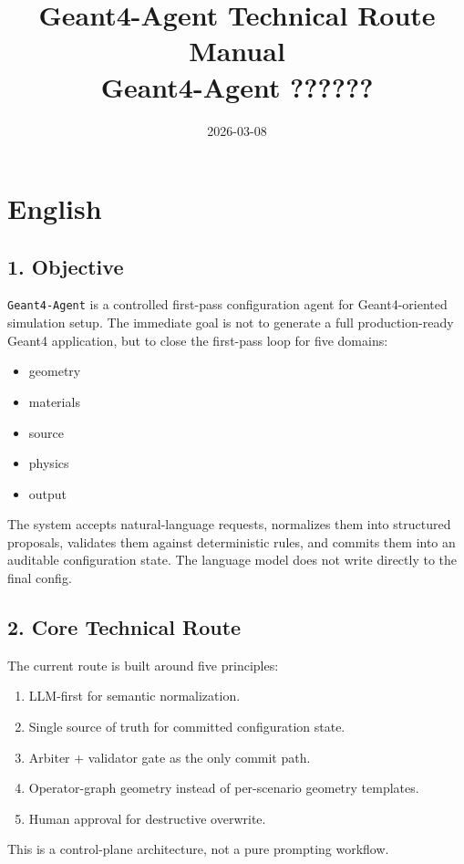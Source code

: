 \documentclass[11pt,a4paper]{ctexart}
\title{Geant4-Agent Technical Route Manual\\Geant4-Agent ??????}
\author{}
\date{2026-03-08}
\begin{document}
\maketitle
\section*{English}
\subsection*{1. Objective}
\texttt{Geant4-Agent} is a controlled first-pass configuration agent for Geant4-oriented simulation setup. The immediate goal is not to generate a full production-ready Geant4 application, but to close the first-pass loop for five domains:
\begin{itemize}
\item geometry
\item materials
\item source
\item physics
\item output
\end{itemize}
The system accepts natural-language requests, normalizes them into structured proposals, validates them against deterministic rules, and commits them into an auditable configuration state. The language model does not write directly to the final config.
\subsection*{2. Core Technical Route}
The current route is built around five principles:
\begin{enumerate}
\item LLM-first for semantic normalization.
\item Single source of truth for committed configuration state.
\item Arbiter + validator gate as the only commit path.
\item Operator-graph geometry instead of per-scenario geometry templates.
\item Human approval for destructive overwrite.
\end{enumerate}
This is a control-plane architecture, not a pure prompting workflow.
\end{document}
